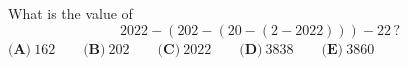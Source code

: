 What is the value of
\[2022-(202-(20-(2-2022)))-22\,?\]
$\textbf{(A)}~162\qquad\textbf{(B)}~202\qquad\textbf{(C)}~2022\qquad\textbf{(D)}~3838\qquad\textbf{(E)}~3860$
